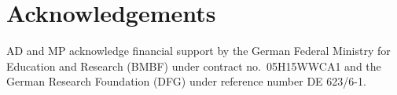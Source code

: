 \documentclass[11pt,epsf]{article}
\newcommand{\MP}[1]{{ {\color{blue}{ [MP: #1]}} }}
\begin{document}
% 


    
\section*{Acknowledgements}

AD and MP acknowledge financial support by the
German Federal Ministry for Education and Research (BMBF) under
contract no.~05H15WWCA1 and the German Research Foundation (DFG) under
reference number DE 623/6-1.





\end{document}
